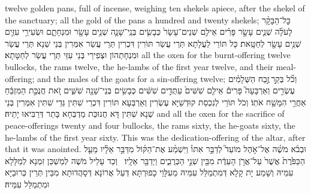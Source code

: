 {twelve golden pans, full of incense, weighing ten shekels apiece, after the shekel of the sanctuary; all the gold of the pans a hundred and twenty shekels;}{}
{כׇּל־הַבָּקָ֨ר לָעֹלָ֜ה שְׁנֵ֧ים עָשָׂ֣ר פָּרִ֗ים אֵילִ֤ם שְׁנֵים־עָשָׂר֙ כְּבָשִׂ֧ים בְּנֵֽי־שָׁנָ֛ה שְׁנֵ֥ים עָשָׂ֖ר וּמִנְחָתָ֑ם וּשְׂעִירֵ֥י עִזִּ֛ים שְׁנֵ֥ים עָשָׂ֖ר לְחַטָּֽאת׃}
{כָּל תּוֹרֵי לַעֲלָתָא תְּרֵי עֲשַׂר תּוֹרִין דִּכְרִין תְּרֵי עֲשַׂר אִמְּרִין בְּנֵי שְׁנָא תְּרֵי עֲשַׂר וּמִנְחָתְהוֹן וּצְפִירֵי בְּנֵי עִזֵּי תְּרֵי עֲשַׂר לְחַטָּתָא׃}
{all the oxen for the burnt-offering twelve bullocks, the rams twelve, the he-lambs of the first year twelve, and their meal-offering; and the males of the goats for a sin-offering twelve;}{}
{וְכֹ֞ל בְּקַ֣ר \legarmeh  זֶ֣בַח הַשְּׁלָמִ֗ים עֶשְׂרִ֣ים וְאַרְבָּעָה֮ פָּרִים֒ אֵילִ֤ם שִׁשִּׁים֙ עַתֻּדִ֣ים שִׁשִּׁ֔ים כְּבָשִׂ֥ים בְּנֵי־שָׁנָ֖ה שִׁשִּׁ֑ים זֹ֚את חֲנֻכַּ֣ת הַמִּזְבֵּ֔חַ אַחֲרֵ֖י הִמָּשַׁ֥ח אֹתֽוֹ׃}
{וְכֹל תּוֹרֵי לְנִכְסַת קוּדְשַׁיָּא עֶשְׂרִין וְאַרְבְּעָא תּוֹרִין דִּכְרֵי שִׁתִּין גְּדֵי שִׁתִּין אִמְּרִין בְּנֵי שְׁנָא שִׁתִּין דָּא חֲנוּכַּת מַדְבְּחָא בָּתַר דְּרַבִּיאוּ יָתֵיהּ׃}
{and all the oxen for the sacrifice of peace-offerings twenty and four bullocks, the rams sixty, the he-goats sixty, the he-lambs of the first year sixty. This was the dedication-offering of the altar, after that it was anointed.}{}
{וּבְבֹ֨א מֹשֶׁ֜ה אֶל־אֹ֣הֶל מוֹעֵד֮ לְדַבֵּ֣ר אִתּוֹ֒ וַיִּשְׁמַ֨ע אֶת־הַקּ֜וֹל מִדַּבֵּ֣ר אֵלָ֗יו מֵעַ֤ל הַכַּפֹּ֙רֶת֙ אֲשֶׁר֙ עַל־אֲרֹ֣ן הָעֵדֻ֔ת מִבֵּ֖ין שְׁנֵ֣י הַכְּרֻבִ֑ים וַיְדַבֵּ֖ר אֵלָֽיו׃ \petucha 
{}}
{וְכַד עָלֵיל מֹשֶׁה לְמַשְׁכַּן זִמְנָא לְמַלָּלָא עִמֵּיהּ וְשָׁמַע יָת קָלָא דְּמִתְמַלַּל עִמֵּיהּ מֵעִלָּוֵי כָפוּרְתָּא דְּעַל אֲרוֹנָא דְּסָהֲדוּתָא מִבֵּין תְּרֵין כְּרוּבַיָּא וּמִתְמַלַּל עִמֵּיהּ׃}
